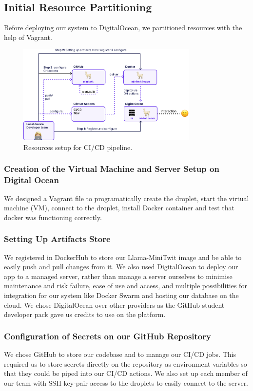 \documentclass{article}
\begin{document}
\subsection{Initial Resource Partitioning}
Before deploying our system to DigitalOcean, we partitioned resources with the help of Vagrant.

\begin{figure}[ht]
    \centering
    \includegraphics[width=0.8\textwidth]{./images/resources_setup_v2.png} 
    \caption{Resources setup for CI/CD pipeline.}
    \label{fig:Resourse setup}
\end{figure}

\subsubsection{Creation of the Virtual Machine and Server Setup on Digital Ocean}
We designed a Vagrant file to programatically create the droplet, start the virtual machine (VM), connect to the droplet, install Docker container and test that docker was functioning correctly.

\subsubsection{Setting Up Artifacts Store}
We registered in DockerHub to store our Llama-MiniTwit image and be able to easily push and pull changes from it. We also used DigitalOcean to deploy our app to a managed server, rather than manage a server ourselves to minimise maintenance and risk failure, ease of use and access, and multiple possibilities for integration for our system like Docker Swarm and hosting our database on the cloud. We chose DigitalOcean over other providers as the GitHub student developer pack gave us credits to use on the platform.

\subsubsection{Configuration of Secrets on our GitHub Repository}
We chose GitHub to store our codebase and to manage our CI/CD jobs. This required us to store secrets directly on the repository as environment variables so that they could be piped into our CI/CD actions. We also set up each member of our team with SSH key-pair access to the droplets to easily connect to the server.
\end{document}
